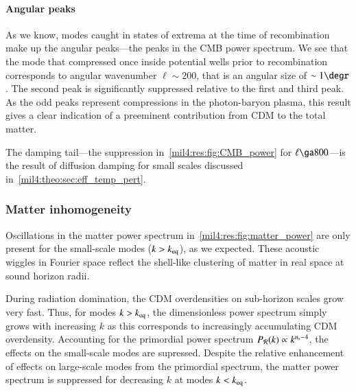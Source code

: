 





\paragraph{Angular peaks}
As we know, modes caught in states of extrema at the time of recombination make up the angular peaks---the peaks in the CMB power spectrum. We see that the mode that compressed once inside potential wells prior to recombination corresponds to angular wavenumber $\ell\sim 200$, that is an angular size of $\sim 1\degr$. The second peak is significantly suppressed relative to the first and third peak. As the odd peaks represent compressions in the photon-baryon plasma, this result gives a clear indication of a preeminent contribution from CDM to the total matter.  

The damping tail---the suppression in~\cref{mil4:res:fig:CMB_power} for $\ell\ga 800$---is the result of diffusion damping for small scales discussed in~\cref{mil4:theo:sec:eff_temp_pert}.



\subsubsection{Matter inhomogeneity}
Oscillations in the matter power spectrum in~\cref{mil4:res:fig:matter_power} are only present for the small-scale modes ($k>k_\mathrm{eq}$), as we expected. These acoustic wiggles in Fourier space reflect the shell-like clustering of matter in real space at sound horizon radii. 

During radiation domination, the CDM overdensities on sub-horizon scales grow very fast. Thus, for modes $k>k_\mathrm{eq}$, the dimensionless power spectrum simply grows with increasing $k$ as this corresponds to increasingly accumulating CDM overdensity. Accounting for the primordial power spectrum $P_\mathcal{R}(k)\propto k^{n_\mathrm{s} - 4}$, the effects on the small-scale modes are supressed. Despite the relative enhancement of effects on large-scale modes from the primordial spectrum, the matter power spectrum is suppressed for decreasing $k$ at modes $k<k_\mathrm{eq}$. 

